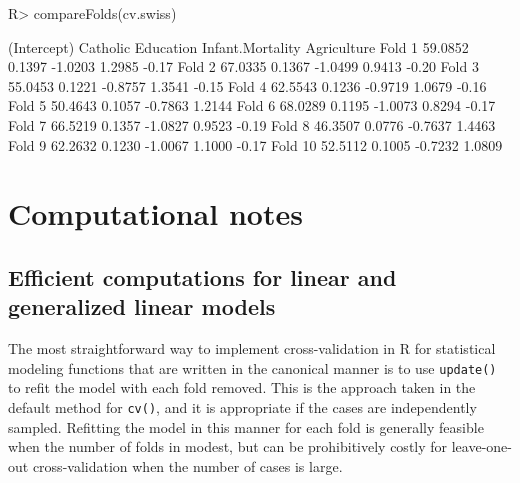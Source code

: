 \documentclass[
]{jss}
\begin{document}
\begin{CodeChunk}
\begin{CodeInput}
R> compareFolds(cv.swiss)
\end{CodeInput}
\begin{CodeOutput}
        (Intercept) Catholic Education Infant.Mortality Agriculture
Fold 1      59.0852   0.1397   -1.0203           1.2985       -0.17
Fold 2      67.0335   0.1367   -1.0499           0.9413       -0.20
Fold 3      55.0453   0.1221   -0.8757           1.3541       -0.15
Fold 4      62.5543   0.1236   -0.9719           1.0679       -0.16
Fold 5      50.4643   0.1057   -0.7863           1.2144            
Fold 6      68.0289   0.1195   -1.0073           0.8294       -0.17
Fold 7      66.5219   0.1357   -1.0827           0.9523       -0.19
Fold 8      46.3507   0.0776   -0.7637           1.4463            
Fold 9      62.2632   0.1230   -1.0067           1.1000       -0.17
Fold 10     52.5112   0.1005   -0.7232           1.0809            
\end{CodeOutput}
\end{CodeChunk}

\hypertarget{computational-notes}{%
\section{Computational notes}\label{computational-notes}}

\hypertarget{efficient-computations-for-linear-and-generalized-linear-models}{%
\subsection{Efficient computations for linear and generalized linear
models}\label{efficient-computations-for-linear-and-generalized-linear-models}}

The most straightforward way to implement cross-validation in R for
statistical modeling functions that are written in the canonical manner
is to use \texttt{update()} to refit the model with each fold removed.
This is the approach taken in the default method for \texttt{cv()}, and
it is appropriate if the cases are independently sampled. Refitting the
model in this manner for each fold is generally feasible when the number
of folds in modest, but can be prohibitively costly for leave-one-out
cross-validation when the number of cases is large.
\end{document}
